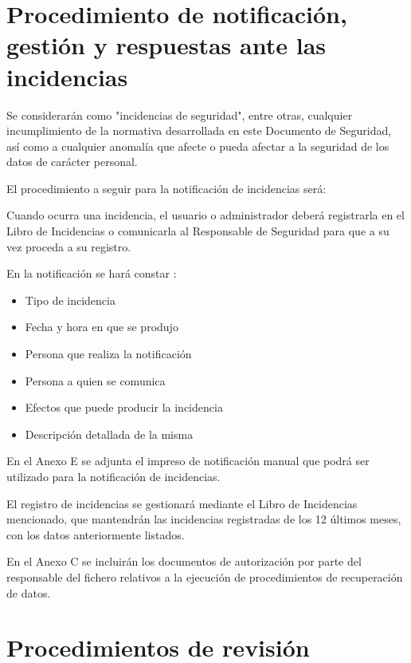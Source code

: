 \documentclass[a4paper,11pt,bibtotoc,noliststotoc]{scrbook}
\begin{document}
\chapter{Procedimiento de notificación, gestión y respuestas ante las incidencias}

Se considerarán como "incidencias de seguridad", entre otras, cualquier incumplimiento de la normativa desarrollada en este Documento de Seguridad, así como a cualquier anomalía que afecte o pueda afectar a la seguridad de los datos de carácter personal.

El procedimiento a seguir para la notificación de incidencias será:

Cuando ocurra una incidencia, el usuario o administrador deberá registrarla en el Libro de Incidencias o comunicarla al Responsable de Seguridad para que a su vez proceda a su registro.

En la notificación se hará constar :
\begin{itemize}
\item Tipo de incidencia
\item Fecha y hora en que se produjo
\item Persona que realiza la notificación
\item Persona a quien se comunica
\item Efectos que puede producir la incidencia
\item Descripción detallada de la misma
\end{itemize}

En el Anexo E se adjunta el impreso de notificación manual que podrá ser utilizado para la notificación de incidencias.

El registro de incidencias se gestionará mediante el Libro de Incidencias mencionado, que mantendrán las incidencias registradas de los 12 últimos meses, con los datos anteriormente listados.

En el Anexo C se incluirán los documentos de autorización por parte del responsable del fichero relativos a la ejecución de procedimientos de recuperación de datos.





\chapter{Procedimientos de revisión}
\end{document}
